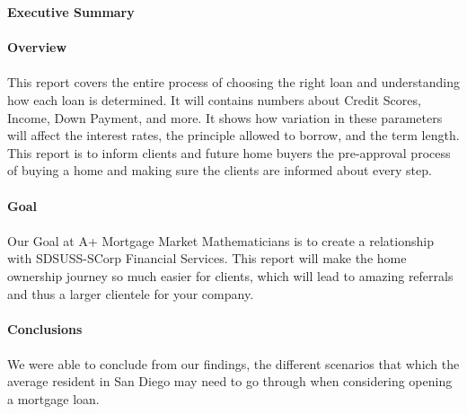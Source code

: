 \documentclass[12pt]{article}
\newenvironment{Section}[1]{}{\newpage}
\begin{document}
	\begin{Section}{Executive Summary}
		\textbf{\Huge Executive Summary}
		\\ \\
		\textbf{\large Overview}
		\\ \\
		This report covers the entire process of choosing the right loan and understanding how each loan is determined.  It will contains numbers about Credit Scores, Income, Down Payment, and more. It shows how variation in these parameters will affect the interest rates, the principle allowed to borrow, and the term length.  This report is to inform clients and future home buyers the pre-approval process of buying a home and making sure the clients are informed about every step.
		\\ \\
		\textbf{\large Goal}
		\\ \\
		Our Goal at A+ Mortgage Market Mathematicians is to create a relationship with SDSUSS-SCorp Financial Services.  This report will make the home ownership journey so much easier for clients, which will lead to amazing referrals and thus a larger clientele for your company.  
		\\ \\
		\textbf{\large Conclusions}
		\\ \\
		We were able to conclude from our findings, the different scenarios that which the average resident in San Diego may need to go through when considering opening a mortgage loan.      
	\end{Section}
\end{document}
